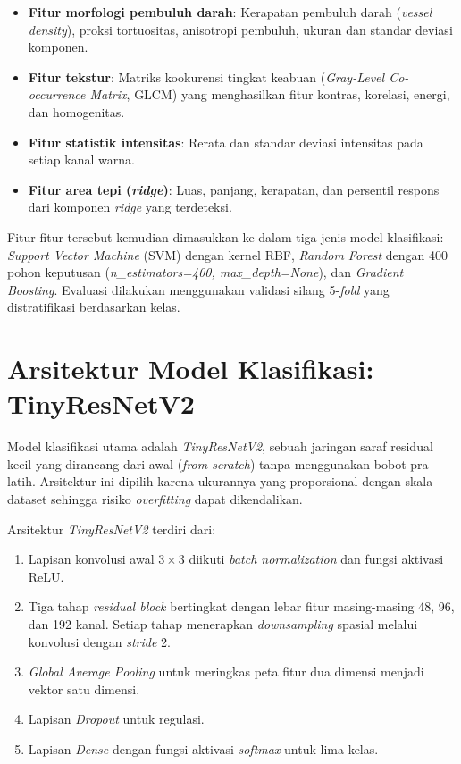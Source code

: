 \begin{itemize}
    \item \textbf{Fitur morfologi pembuluh darah}: Kerapatan pembuluh darah (\textit{vessel
    density}), proksi tortuositas, anisotropi pembuluh, ukuran dan standar deviasi komponen.
    \item \textbf{Fitur tekstur}: Matriks kookurensi tingkat keabuan (\textit{Gray-Level
    Co-occurrence Matrix}, GLCM) \citep{Khandouzi2022} yang menghasilkan fitur kontras,
    korelasi, energi, dan homogenitas.
    \item \textbf{Fitur statistik intensitas}: Rerata dan standar deviasi intensitas pada
    setiap kanal warna.
    \item \textbf{Fitur area tepi (\textit{ridge})}: Luas, panjang, kerapatan, dan persentil
    respons dari komponen \textit{ridge} yang terdeteksi.
\end{itemize}

Fitur-fitur tersebut kemudian dimasukkan ke dalam tiga jenis model klasifikasi: \textit{Support
Vector Machine} (SVM) dengan kernel RBF, \textit{Random Forest} \citep{Breiman2001} dengan 400
pohon keputusan (\textit{n\_estimators=400, max\_depth=None}), dan \textit{Gradient Boosting}.
Evaluasi dilakukan menggunakan validasi silang 5-\textit{fold} yang distratifikasi berdasarkan kelas.

\section{Arsitektur Model Klasifikasi: TinyResNetV2}

Model klasifikasi utama adalah \textit{TinyResNetV2}, sebuah jaringan saraf residual kecil yang
dirancang dari awal (\textit{from scratch}) tanpa menggunakan bobot pra-latih. Arsitektur ini
dipilih karena ukurannya yang proporsional dengan skala dataset sehingga risiko \textit{overfitting}
dapat dikendalikan.

Arsitektur \textit{TinyResNetV2} terdiri dari:
\begin{enumerate}
    \item Lapisan konvolusi awal $3 \times 3$ diikuti \textit{batch normalization} dan fungsi
    aktivasi ReLU.
    \item Tiga tahap \textit{residual block} bertingkat dengan lebar fitur masing-masing 48,
    96, dan 192 kanal. Setiap tahap menerapkan \textit{downsampling} spasial melalui konvolusi
    dengan \textit{stride} 2.
    \item \textit{Global Average Pooling} untuk meringkas peta fitur dua dimensi menjadi vektor
    satu dimensi.
    \item Lapisan \textit{Dropout} untuk regulasi.
    \item Lapisan \textit{Dense} dengan fungsi aktivasi \textit{softmax} untuk lima kelas.
\end{enumerate}


